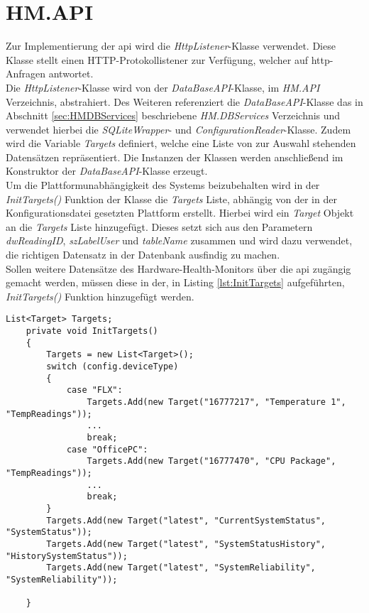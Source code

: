 \newpage
\section{HM.API}
Zur Implementierung der \ac{api} wird die \textit{HttpListener}-Klasse verwendet. Diese Klasse stellt einen HTTP-Protokollistener zur Verfügung, welcher auf \ac{http}-Anfragen antwortet. \cite{HttpListener}\\
Die \textit{HttpListener}-Klasse wird von der \textit{DataBaseAPI}-Klasse, im \textit{HM.API} Verzeichnis, abstrahiert. Des Weiteren referenziert die \textit{DataBaseAPI}-Klasse das in Abschnitt \ref{sec:HMDBServices} beschriebene \textit{HM.DBServices} Verzeichnis und verwendet hierbei die \textit{SQLiteWrapper}- und \textit{ConfigurationReader}-Klasse. Zudem wird die Variable \textit{Targets} definiert, welche eine Liste von zur Auswahl stehenden Datensätzen repräsentiert. Die Instanzen der Klassen werden anschließend im Konstruktor der \textit{DataBaseAPI}-Klasse erzeugt.\\
Um die Plattformunabhängigkeit des Systems beizubehalten wird in der \textit{InitTargets()} Funktion der Klasse die \textit{Targets} Liste, abhängig von der in der Konfigurationsdatei gesetzten Plattform erstellt. Hierbei wird ein \textit{Target} Objekt an die \textit{Targets} Liste hinzugefügt. Dieses setzt sich aus den Parametern \textit{dwReadingID}, \textit{szLabelUser} und \textit{tableName} zusammen und wird dazu verwendet, die richtigen Datensatz in der Datenbank ausfindig zu machen.\\
Sollen weitere Datensätze des Hardware-Health-Monitors über die \ac{api} zugängig gemacht werden, müssen diese in der, in Listing \ref{lst:InitTargets} aufgeführten, \textit{InitTargets()} Funktion hinzugefügt werden. 
\begin{lstlisting}[caption={InitTargets Funktino der DataBaseAPI}, label={lst:InitTargets}]
    List<Target> Targets;
    private void InitTargets()
    {
        Targets = new List<Target>();
        switch (config.deviceType)
        {
            case "FLX":
                Targets.Add(new Target("16777217", "Temperature 1", "TempReadings"));
                ...
                break;
            case "OfficePC":
                Targets.Add(new Target("16777470", "CPU Package", "TempReadings"));
                ...
                break;
        }
        Targets.Add(new Target("latest", "CurrentSystemStatus", "SystemStatus"));
        Targets.Add(new Target("latest", "SystemStatusHistory", "HistorySystemStatus"));
        Targets.Add(new Target("latest", "SystemReliability", "SystemReliability"));

    }
\end{lstlisting}
